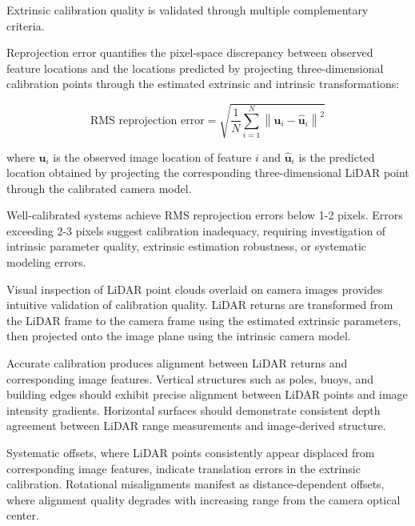\documentclass{erauthesis}
\begin{document}

Extrinsic calibration quality is validated through multiple complementary criteria.


Reprojection error quantifies the pixel-space discrepancy between observed feature locations and the locations predicted by projecting three-dimensional calibration points through the estimated extrinsic and intrinsic transformations:

\begin{equation}
    \text{RMS reprojection error} = \sqrt{\frac{1}{N}\sum_{i=1}^{N} \left\| \mathbf{u}_i - \hat{\mathbf{u}}_i \right\|^2} 
\end{equation}

where $\mathbf{u}_i$ is the observed image location of feature $i$ and $\hat{\mathbf{u}}_i$ is the predicted location obtained by projecting the corresponding three-dimensional LiDAR point through the calibrated camera model.

Well-calibrated systems achieve RMS reprojection errors below 1-2 pixels.
Errors exceeding 2-3 pixels suggest calibration inadequacy, requiring investigation of intrinsic parameter quality, extrinsic estimation robustness, or systematic modeling errors.


Visual inspection of LiDAR point clouds overlaid on camera images provides intuitive validation of calibration quality.
LiDAR returns are transformed from the LiDAR frame to the camera frame using the estimated extrinsic parameters, then projected onto the image plane using the intrinsic camera model.

Accurate calibration produces alignment between LiDAR returns and corresponding image features.
Vertical structures such as poles, buoys, and building edges should exhibit precise alignment between LiDAR points and image intensity gradients.
Horizontal surfaces should demonstrate consistent depth agreement between LiDAR range measurements and image-derived structure.

Systematic offsets, where LiDAR points consistently appear displaced from corresponding image features, indicate translation errors in the extrinsic calibration.
Rotational misalignments manifest as distance-dependent offsets, where alignment quality degrades with increasing range from the camera optical center.

\end{document}
